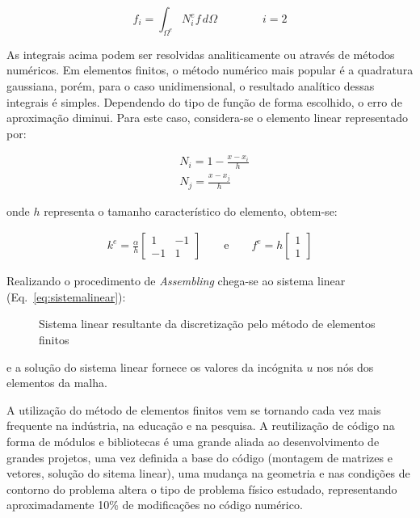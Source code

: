 \begin{equation}
	f_{i} = \int_{\Omega^e} N_i^e f \, d\Omega
	\qquad \qquad
	i=2
\end{equation}

\noindent As integrais acima podem ser resolvidas analiticamente ou
através de métodos numéricos.  Em elementos finitos, o método numérico
mais popular é a quadratura gaussiana, porém, para o caso
unidimensional, o resultado analítico dessas integrais é simples.
Dependendo do tipo de função de forma escolhido, o erro de aproximação
diminui.  Para este caso, considera-se o elemento linear representado
por:

\begin{align}
	&N_i = 1 - \frac{x-x_i}{h}
	\\
	&N_j = \frac{x - x_j}{h} 
\end{align}

\noindent onde $h$ representa o tamanho característico do elemento,
obtem-se:

\begin{gather*}
	k^e 
	= 
	\frac{\alpha}{h}\begin{bmatrix}1 & -1 \\ -1 &1\end{bmatrix}
	\qquad \text{e} \qquad
	f^e 
	=  
	h\begin{bmatrix}1 \\ 1\end{bmatrix}
\end{gather*}

\noindent Realizando o procedimento de \emph{Assembling} chega-se ao
sistema linear (Eq.~\ref{eq:sistemalinear}):

\begin{figure}[h]
	\centering
		\caption[Sistema linear do método de elementos finitos]
		{Sistema linear resultante da discretização pelo método 
		de elementos finitos}
	\label{fig:sistema}
\end{figure}

\noindent e a solução do sistema linear fornece os valores da incógnita
$u$ nos nós dos elementos da malha.

A utilização do método de elementos finitos vem se tornando cada vez
mais frequente na indústria, na educação e na pesquisa. A reutilização
de código na forma de módulos e bibliotecas é uma grande aliada ao
desenvolvimento de grandes projetos, uma vez definida a base do código
(montagem de matrizes e vetores, solução do sitema linear), uma mudança
na geometria e nas condições de contorno do problema altera o tipo de
problema físico estudado, representando aproximadamente 10\% de
modificações no código numérico.   



